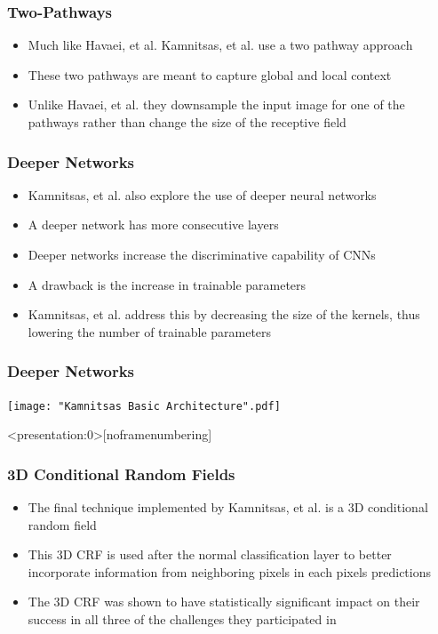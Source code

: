 \documentclass{beamer}
\begin{document}
\begin{frame}
  \frametitle{Two-Pathways}
  \begin{itemize}
	\item Much like Havaei, et al. Kamnitsas, et al. use a two pathway approach
	\item These two pathways are meant to capture global and local context
	\item Unlike Havaei, et al. they downsample the input image for one of the pathways rather than change the size of the receptive field
  \end{itemize}
\end{frame}

\begin{frame}
  \frametitle{Deeper Networks}
  \begin{itemize}
	\item Kamnitsas, et al. also explore the use of deeper neural networks
	\item A deeper network has more consecutive layers
	\item Deeper networks increase the discriminative capability of CNNs
	\item A drawback is the increase in trainable parameters
	\item Kamnitsas, et al. address this by decreasing the size of the kernels, thus lowering the number of trainable parameters
  \end{itemize}
\end{frame}

\begin{frame}
  \frametitle{Deeper Networks}
  \texttt{[image: "Kamnitsas Basic Architecture".pdf]}
  \\
\end{frame}

\begin{frame}<presentation:0>[noframenumbering]
  \frametitle{3D Conditional Random Fields}
  \begin{itemize}
	\item The final technique implemented by Kamnitsas, et al. is a 3D conditional random field
	\item This 3D CRF is used after the normal classification layer to better incorporate information from neighboring pixels in each pixels predictions
	\item The 3D CRF was shown to have statistically significant impact on their success in all three of the challenges they participated in
  \end{itemize}
\end{frame}
\end{document}
